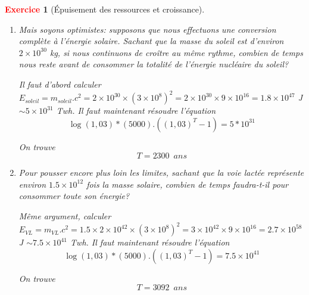 \documentclass[11pt]{article}
\theoremstyle{mythmstyle}
\newtheorem{exo}{\textcolor{red}{\textbf{Exercice}}}
\begin{document}
\begin{exo}[Épuisement des ressources et croissance]
\begin{enumerate}
\begin{solution}
     On trouve 
     $$T=1856\sim 18,5 \,\text{siècles}$$
     
\end{solution}

\item Mais soyons optimistes: supposons que nous effectuons une conversion complète à l'énergie solaire. Sachant que la masse du soleil est d'environ  $2\times10^{30}$ kg, si nous continuons de croître au même rythme, combien de temps nous reste avant de consommer la totalité de l'énergie nucléaire du soleil?
\begin{solution}
    Il faut d'abord calculer $E_{soleil}=m_{soleil}. c^2= 2\times 10^{30}\times (3\times 10^8)^2 =2\times 10^{30}\times 9\times 10^{16}= 1.8\times 10^{47}$ J $\sim 5\times 10^{31}$ Twh. Il faut maintenant résoudre l'équation
     $$
     \log (1,03)*(5000).((1,03)^T-1)=5*10^{31}
     $$
     
     On trouve 
     $$T=2300\,\,\, ans$$
     
\end{solution}
\item Pour pousser encore plus loin les limites, sachant que la voie lactée représente environ $1.5\times 10^{12}$ fois la masse solaire, combien de temps faudra-t-il pour consommer toute son énergie?

\begin{solution}
 Même argument, calculer $E_{VL}=m_{VL}. c^2= 1.5\times 2\times 10^{42}\times (3\times 10^8)^2 =3\times 10^{42}\times 9\times 10^{16}= 2.7\times 10^{58}$ J $\sim 7.5\times 10^{41}$ Twh. Il faut maintenant résoudre l'équation
     $$
     \log (1,03)*(5000).((1,03)^T-1)=7.5\times 10^{41}
     $$
     
     On trouve 
     $$T=3092\,\,\, ans$$
\end{solution}
\end{enumerate}
\end{exo}
\end{document}
